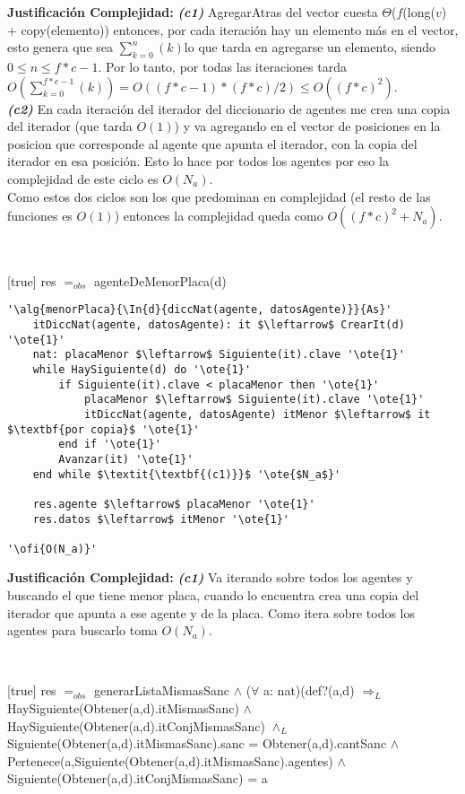 \textbf{Justificación Complejidad:} \textit{\textbf{(c1)}} AgregarAtras del vector cuesta $\Theta$($f$(long($v$) + copy(elemento)) entonces, por cada iteración hay un elemento más en el vector, esto genera que sea $\sum_{k=0}^{n}(k)$lo que tarda en agregarse un elemento, siendo $0\leq n \leq f*c-1$. Por lo tanto, por todas las iteraciones tarda $O(\sum_{k=0}^{f*c - 1}(k)) = O((f*c-1)*(f*c)/2) \leq O((f*c)^2)$. \\
\textit{\textbf{(c2)}} En cada iteración del iterador del diccionario de agentes me crea una copia del iterador (que tarda $O(1)$) y va agregando en el vector de posiciones en la posicion que corresponde al agente que apunta el iterador, con la copia del iterador en esa posición. Esto lo hace por todos los agentes por eso la complejidad de este ciclo es $O(N_a)$. \\
Como estos dos ciclos son los que predominan en complejidad (el resto de las funciones es $O(1)$) entonces la complejidad queda como $O((f*c)^2 + N_a)$.


~

[true]
{res $=_{obs}$ agenteDeMenorPlaca(d)}

\begin{lstlisting}[mathescape]
'\alg{menorPlaca}{\In{d}{diccNat(agente, datosAgente)}}{As}'
	itDiccNat(agente, datosAgente): it $\leftarrow$ CrearIt(d) '\ote{1}'
	nat: placaMenor $\leftarrow$ Siguiente(it).clave '\ote{1}'
	while HaySiguiente(d) do '\ote{1}'
		if Siguiente(it).clave < placaMenor	then '\ote{1}'
			placaMenor $\leftarrow$ Siguiente(it).clave '\ote{1}'
			itDiccNat(agente, datosAgente) itMenor $\leftarrow$ it $\textbf{por copia}$ '\ote{1}'
		end if '\ote{1}'
		Avanzar(it) '\ote{1}'
	end while $\textit{\textbf{(c1)}}$ '\ote{$N_a$}'

	res.agente $\leftarrow$ placaMenor '\ote{1}'
	res.datos $\leftarrow$ itMenor '\ote{1}'

'\ofi{O(N_a)}'
\end{lstlisting}

\textbf{Justificación Complejidad:} \textit{\textbf{(c1)}} Va iterando sobre todos los agentes y buscando el que tiene menor placa, cuando lo encuentra crea una copia del iterador que apunta a ese agente y de la placa. Como itera sobre todos los agentes para buscarlo toma $O(N_a)$.

~


[true]
{res $=_{obs}$ generarListaMismasSanc $\land$ ($\forall$ a: nat)(def?(a,d) $\Rightarrow_L$ HaySiguiente(Obtener(a,d).itMismasSanc) $\land$ HaySiguiente(Obtener(a,d).itConjMismasSanc) $\land_L$ Siguiente(Obtener(a,d).itMismasSanc).sanc = Obtener(a,d).cantSanc $\land$ Pertenece(a,Siguiente(Obtener(a,d).itMismasSanc).agentes) $\land$ Siguiente(Obtener(a,d).itConjMismasSanc) = a}

